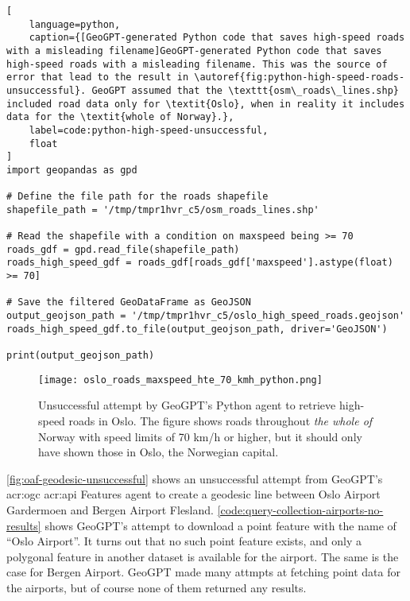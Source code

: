 \begin{lstlisting}[
    language=python,
    caption={[GeoGPT-generated Python code that saves high-speed roads with a misleading filename]GeoGPT-generated Python code that saves high-speed roads with a misleading filename. This was the source of error that lead to the result in \autoref{fig:python-high-speed-roads-unsuccessful}. GeoGPT assumed that the \texttt{osm\_roads\_lines.shp} included road data only for \textit{Oslo}, when in reality it includes data for the \textit{whole of Norway}.},
    label=code:python-high-speed-unsuccessful,
    float
]
import geopandas as gpd

# Define the file path for the roads shapefile
shapefile_path = '/tmp/tmpr1hvr_c5/osm_roads_lines.shp'

# Read the shapefile with a condition on maxspeed being >= 70
roads_gdf = gpd.read_file(shapefile_path)
roads_high_speed_gdf = roads_gdf[roads_gdf['maxspeed'].astype(float) >= 70]

# Save the filtered GeoDataFrame as GeoJSON
output_geojson_path = '/tmp/tmpr1hvr_c5/oslo_high_speed_roads.geojson'
roads_high_speed_gdf.to_file(output_geojson_path, driver='GeoJSON')

print(output_geojson_path)
\end{lstlisting}

\FloatBarrier

\begin{figure}[htbp]
    \centering
    \texttt{[image: oslo\_roads\_maxspeed\_hte\_70\_kmh\_python.png]}
    \caption[Unsuccessful attempt by GeoGPT's Python agent to retrieve high-speed roads in Oslo]{Unsuccessful attempt by GeoGPT's Python agent to retrieve high-speed roads in Oslo. The figure shows roads throughout \textit{the whole of} Norway with speed limits of 70 km/h or higher, but it should only have shown those in Oslo, the Norwegian capital.}
    \label{fig:python-high-speed-roads-unsuccessful}
\end{figure}


\FloatBarrier

\autoref{fig:oaf-geodesic-unsuccessful} shows an unsuccessful attempt from GeoGPT's \acrshort{acr:ogc} \acrshort{acr:api} Features agent to create a geodesic line between Oslo Airport Gardermoen and Bergen Airport Flesland. \autoref{code:query-collection-airports-no-results} shows GeoGPT's attempt to download a point feature with the name of \enquote{Oslo Airport}. It turns out that no such point feature exists, and only a polygonal feature in another dataset is available for the airport. The same is the case for Bergen Airport. GeoGPT made many attmpts at fetching point data for the airports, but of course none of them  returned any results.

